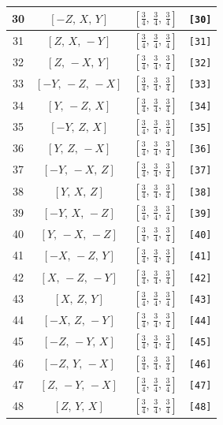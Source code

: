 \documentclass[fleqn,8pt]{jsarticle}
\begin{document}
\begin{longtable}{cccc}
30 & $\left[ - Z,\, X,\, Y \right]$ & $\left[ \frac{3}{4},\, \frac{3}{4},\, \frac{3}{4} \right]$ & {\tt [30]} \\ \hline
31 & $\left[ Z,\, X,\, - Y \right]$ & $\left[ \frac{3}{4},\, \frac{3}{4},\, \frac{3}{4} \right]$ & {\tt [31]} \\ \hline
32 & $\left[ Z,\, - X,\, Y \right]$ & $\left[ \frac{3}{4},\, \frac{3}{4},\, \frac{3}{4} \right]$ & {\tt [32]} \\ \hline
33 & $\left[ - Y,\, - Z,\, - X \right]$ & $\left[ \frac{3}{4},\, \frac{3}{4},\, \frac{3}{4} \right]$ & {\tt [33]} \\ \hline
34 & $\left[ Y,\, - Z,\, X \right]$ & $\left[ \frac{3}{4},\, \frac{3}{4},\, \frac{3}{4} \right]$ & {\tt [34]} \\ \hline
35 & $\left[ - Y,\, Z,\, X \right]$ & $\left[ \frac{3}{4},\, \frac{3}{4},\, \frac{3}{4} \right]$ & {\tt [35]} \\ \hline
36 & $\left[ Y,\, Z,\, - X \right]$ & $\left[ \frac{3}{4},\, \frac{3}{4},\, \frac{3}{4} \right]$ & {\tt [36]} \\ \hline
37 & $\left[ - Y,\, - X,\, Z \right]$ & $\left[ \frac{3}{4},\, \frac{3}{4},\, \frac{3}{4} \right]$ & {\tt [37]} \\ \hline
38 & $\left[ Y,\, X,\, Z \right]$ & $\left[ \frac{3}{4},\, \frac{3}{4},\, \frac{3}{4} \right]$ & {\tt [38]} \\ \hline
39 & $\left[ - Y,\, X,\, - Z \right]$ & $\left[ \frac{3}{4},\, \frac{3}{4},\, \frac{3}{4} \right]$ & {\tt [39]} \\ \hline
40 & $\left[ Y,\, - X,\, - Z \right]$ & $\left[ \frac{3}{4},\, \frac{3}{4},\, \frac{3}{4} \right]$ & {\tt [40]} \\ \hline
41 & $\left[ - X,\, - Z,\, Y \right]$ & $\left[ \frac{3}{4},\, \frac{3}{4},\, \frac{3}{4} \right]$ & {\tt [41]} \\ \hline
42 & $\left[ X,\, - Z,\, - Y \right]$ & $\left[ \frac{3}{4},\, \frac{3}{4},\, \frac{3}{4} \right]$ & {\tt [42]} \\ \hline
43 & $\left[ X,\, Z,\, Y \right]$ & $\left[ \frac{3}{4},\, \frac{3}{4},\, \frac{3}{4} \right]$ & {\tt [43]} \\ \hline
44 & $\left[ - X,\, Z,\, - Y \right]$ & $\left[ \frac{3}{4},\, \frac{3}{4},\, \frac{3}{4} \right]$ & {\tt [44]} \\ \hline
45 & $\left[ - Z,\, - Y,\, X \right]$ & $\left[ \frac{3}{4},\, \frac{3}{4},\, \frac{3}{4} \right]$ & {\tt [45]} \\ \hline
46 & $\left[ - Z,\, Y,\, - X \right]$ & $\left[ \frac{3}{4},\, \frac{3}{4},\, \frac{3}{4} \right]$ & {\tt [46]} \\ \hline
47 & $\left[ Z,\, - Y,\, - X \right]$ & $\left[ \frac{3}{4},\, \frac{3}{4},\, \frac{3}{4} \right]$ & {\tt [47]} \\ \hline
48 & $\left[ Z,\, Y,\, X \right]$ & $\left[ \frac{3}{4},\, \frac{3}{4},\, \frac{3}{4} \right]$ & {\tt [48]} \\
\end{longtable}
\end{document}
